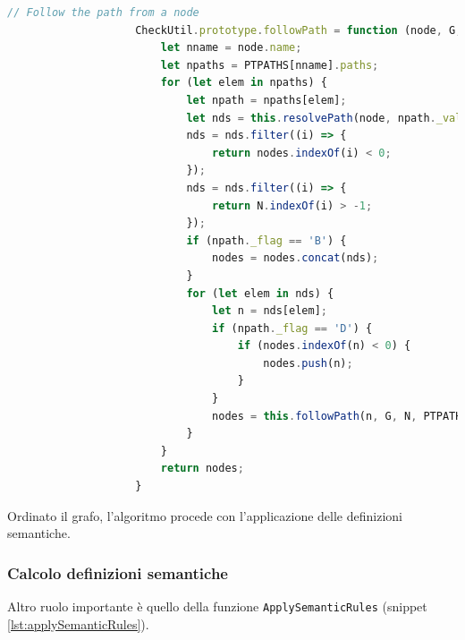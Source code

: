                \begin{lstlisting}[language=JavaScript, basicstyle=\tiny, caption={La funzione followPath}, label={lst:followPath}]
                    // Follow the path from a node
                    CheckUtil.prototype.followPath = function (node, G, N, PTPATHS, nodes) {
                        let nname = node.name;
                        let npaths = PTPATHS[nname].paths;
                        for (let elem in npaths) {
                            let npath = npaths[elem];
                            let nds = this.resolvePath(node, npath._value);
                            nds = nds.filter((i) => {
                                return nodes.indexOf(i) < 0;
                            });
                            nds = nds.filter((i) => {
                                return N.indexOf(i) > -1;
                            });
                            if (npath._flag == 'B') {
                                nodes = nodes.concat(nds);
                            }
                            for (let elem in nds) {
                                let n = nds[elem];
                                if (npath._flag == 'D') {
                                    if (nodes.indexOf(n) < 0) {
                                        nodes.push(n);
                                    }
                                }
                                nodes = this.followPath(n, G, N, PTPATHS, nodes);
                            }
                        }
                        return nodes;
                    }
                \end{lstlisting}
                \newpage
                Ordinato il grafo, l'algoritmo procede con l'applicazione delle definizioni semantiche.
                
            \subsubsection{Calcolo definizioni semantiche}
                Altro ruolo importante è quello della funzione \texttt{ApplySemanticRules} (snippet \ref{lst:applySemanticRules}).

